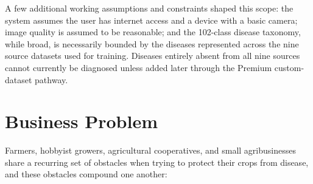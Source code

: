 A few additional working assumptions and constraints shaped this scope: the system assumes the user has internet access and a device with a basic camera; image quality is assumed to be reasonable; and the 102-class disease taxonomy, while broad, is necessarily bounded by the diseases represented across the nine source datasets used for training. Diseases entirely absent from all nine sources cannot currently be diagnosed unless added later through the Premium custom-dataset pathway.

\section{Business Problem}
\label{sec:intro_problem}

Farmers, hobbyist growers, agricultural cooperatives, and small agribusinesses share a recurring set of obstacles when trying to protect their crops from disease, and these obstacles compound one another:

